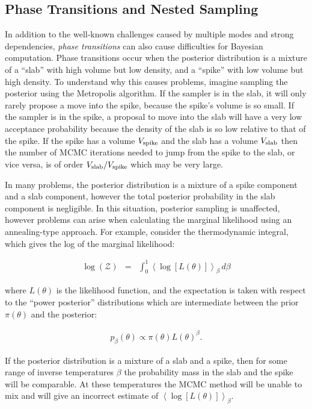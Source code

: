 \documentclass[letterpaper, 11pt]{article}
\begin{document}
\subsection{Phase Transitions and Nested Sampling}
In addition to the well-known challenges caused by multiple modes and strong
dependencies,
{\it phase transitions} \citep{skilling} can also cause difficulties for
Bayesian computation. Phase transitions occur when the posterior distribution
is a mixture of a ``slab'' with high volume but low density, and a ``spike''
with low volume but high density. To understand why this causes problems,
imagine sampling the posterior using the Metropolis algorithm. If the sampler
is in the slab, it will only rarely propose a move into the spike, because the
spike's volume is so small. If the sampler is in the spike, a proposal to move
into the slab will have a very low acceptance probability because the density
of the slab is so low relative to that of the spike. If the spike has a volume
$V_{\rm spike}$ and the slab has a volume $V_{\rm slab}$ then the number of
MCMC iterations needed to jump from the spike to the slab, or vice versa, is
of order $V_{\rm slab}/V_{\rm spike}$ which may be very large.

In many problems, the posterior distribution is a mixture of a spike component
and a slab component, however the total posterior probability in the slab
component is negligible. In this situation, posterior sampling is unaffected,
however problems can arise when calculating the marginal likelihood using
an annealing-type approach. For example, consider the thermodynamic integral,
which gives the log of the marginal likelihood:

\begin{eqnarray}
\log(\mathcal{Z}) &=& \int_0^1
\left<\log\left[L(\theta)\right]\right>_\beta \,d\beta
\end{eqnarray}

where $L(\theta)$ is the likelihood function, and the expectation is taken
with respect to the ``power posterior'' distributions which are intermediate
between the prior $\pi(\theta)$ and the posterior:

\begin{eqnarray}
p_\beta(\theta) \propto \pi(\theta)L(\theta)^\beta.
\end{eqnarray}

If the posterior distribution is a mixture of a slab and a spike,
then for some range of inverse temperatures $\beta$ the probability mass in
the slab and the spike will be comparable. At these temperatures the MCMC
method will be unable to mix and will give an incorrect estimate of
$\left<\log\left[L(\theta)\right]\right>_\beta$.
\end{document}
